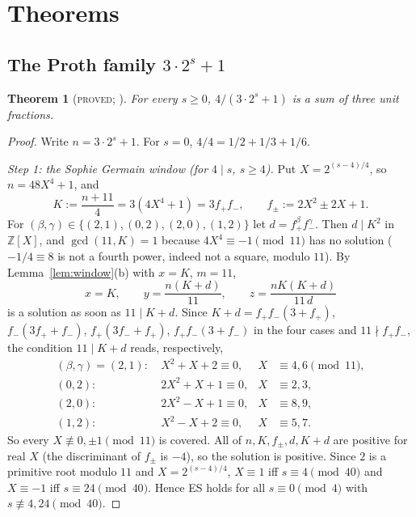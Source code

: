 \documentclass[11pt,reqno]{amsart}
\newtheorem{theorem}{Theorem}[section]
\theoremstyle{definition}
\newcommand{\Z}{\mathbb Z}
\newcommand{\status}[1]{\textup{\textsc{#1}}}
\begin{document}
\section{Theorems}\label{sec:theorems}

\subsection{The Proth family $3\cdot 2^s+1$}

\begin{theorem}[\status{proved}; {\cite[Thm.~C]{MenuSterility}}]\label{thm:proth3}
For every $s\ge0$, $4/(3\cdot2^s+1)$ is a sum of three unit fractions.
\end{theorem}

\begin{proof}
Write $n=3\cdot2^s+1$.  For $s=0$, $4/4=1/2+1/3+1/6$.

\emph{Step 1: the Sophie Germain window (for $4\mid s$, $s\ge4$).}  Put
$X=2^{(s-4)/4}$, so $n=48X^4+1$, and
\[
 K:=\frac{n+11}4=3(4X^4+1)=3f_+f_-,\qquad f_\pm:=2X^2\pm2X+1 .
\]
For $(\beta,\gamma)\in\{(2,1),(0,2),(2,0),(1,2)\}$ let $d=f_+^\beta f_-^\gamma$.
Then $d\mid K^2$ in $\Z[X]$, and $\gcd(11,K)=1$ because $4X^4\equiv-1\pmod{11}$
has no solution ($-1/4\equiv8$ is not a fourth power, indeed not a square,
modulo $11$).  By Lemma~\ref{lem:window}(b) with $x=K$, $m=11$,
\[
 x=K,\qquad y=\frac{n(K+d)}{11},\qquad z=\frac{nK(K+d)}{11\,d}
\]
is a solution as soon as $11\mid K+d$.  Since $K+d=f_+f_-(3+f_+)$,
$f_-(3f_++f_-)$, $f_+(3f_-+f_+)$, $f_+f_-(3+f_-)$ in the four cases and
$11\nmid f_+f_-$, the condition $11\mid K+d$ reads, respectively,
\begin{align*}
 (\beta,\gamma)=(2,1):&\ X^2+X+2\equiv0, & X&\equiv4,6 \pmod{11},\\
 (0,2):&\ 2X^2+X+1\equiv0, & X&\equiv2,3,\\
 (2,0):&\ 2X^2-X+1\equiv0, & X&\equiv8,9,\\
 (1,2):&\ X^2-X+2\equiv0, & X&\equiv5,7 .
\end{align*}
So every $X\not\equiv0,\pm1\pmod{11}$ is covered.  All of $n,K,f_\pm,d,K+d$
are positive for real $X$ (the discriminant of $f_\pm$ is $-4$), so the
solution is positive.  Since $2$ is a primitive root modulo $11$ and
$X=2^{(s-4)/4}$, $X\equiv1$ iff $s\equiv4\pmod{40}$ and $X\equiv-1$ iff
$s\equiv24\pmod{40}$.  Hence ES holds for all $s\equiv0\pmod4$ with
$s\not\equiv4,24\pmod{40}$.


\end{proof}
\end{document}

